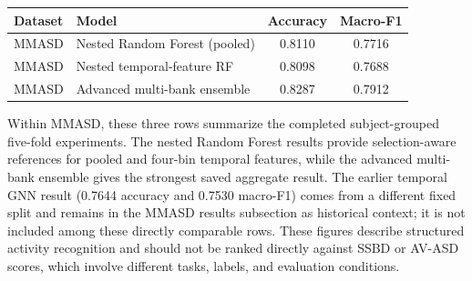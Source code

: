\documentclass[a4paper,12pt]{report}
\begin{document}

\begin{tabular}{|l|p{3.3cm}|c|c|}
\hline
\textbf{Dataset} & \textbf{Model} & \textbf{Accuracy} & \textbf{Macro-F1} \\
\hline
MMASD & Nested Random Forest (pooled) & 0.8110 & 0.7716 \\
\hline
MMASD & Nested temporal-feature RF & 0.8098 & 0.7688 \\
\hline
MMASD & Advanced multi-bank ensemble & 0.8287 & 0.7912 \\
\hline
\end{tabular}

Within MMASD, these three rows summarize the completed subject-grouped five-fold experiments. The nested Random Forest results provide selection-aware references for pooled and four-bin temporal features, while the advanced multi-bank ensemble gives the strongest saved aggregate result. The earlier temporal GNN result (0.7644 accuracy and 0.7530 macro-F1) comes from a different fixed split and remains in the MMASD results subsection as historical context; it is not included among these directly comparable rows. These figures describe structured activity recognition and should not be ranked directly against SSBD or AV-ASD scores, which involve different tasks, labels, and evaluation conditions.

\end{document}
